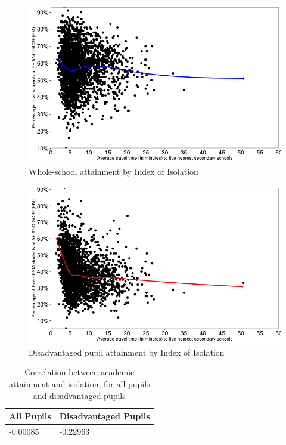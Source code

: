 \documentclass[12pt, a4paper]{article}
\begin{document}
\begin{figure}
\label{figure1}
\caption{Whole-school attainment by Index of Isolation}
\includegraphics[width=\linewidth]{img/Figure1.jpg}
\end{figure}

\begin{figure}
\label{figure2}
\caption{Disadvantaged pupil attainment by Index of Isolation}
\includegraphics[width=\linewidth]{img/Figure2.jpg}
\end{figure}

\begin{table}[H]
	\centering
 \caption{Correlation between academic attainment and isolation, for all pupils and disadvantaged pupils} 
 \label{table1}
\begin{tabularx}{\linewidth}{|X|X|}
\hline
	All Pupils & Disadvantaged Pupils \\ 
	 \hline
 	-0.00085 & -0.22963 \\
 	\hline
 \end{tabularx}
\end{table}
\end{document}
